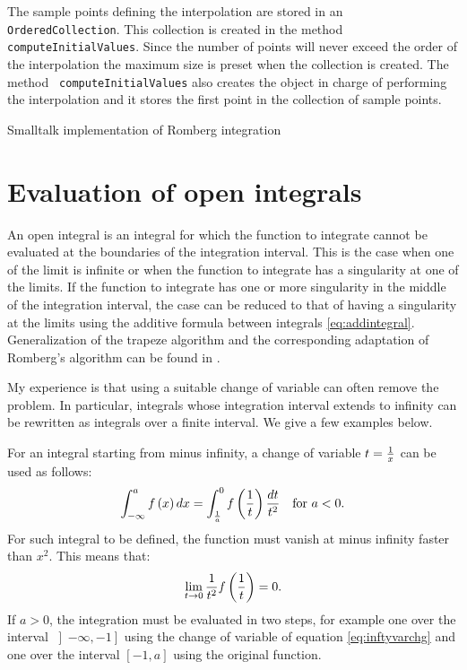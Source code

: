 \documentclass[twoside]{book}
\begin{document}
The sample points defining the interpolation are stored in an {\tt
OrderedCollection}. This collection is created in the method {\tt
computeInitialValues}. Since the number of points will never
exceed the order of the interpolation the maximum size is preset
when the collection is created. The method {\tt
computeInitialValues} also creates the object in charge of
performing the interpolation and it stores the first point in the
collection of sample points.
\begin{listing} Smalltalk implementation of Romberg integration \label{ls:romberg}

\end{listing}

\section{Evaluation of open integrals}
An open integral is an integral for which the function to
integrate cannot be evaluated at the boundaries of the integration
interval. This is the case when one of the limit is infinite or
when the function to integrate has a singularity at one of the
limits. If the function to integrate has one or more singularity
in the middle of the integration interval, the case can be reduced
to that of having a singularity at the limits using the additive
formula between integrals \ref{eq:addintegral}. Generalization of
the trapeze algorithm and the corresponding adaptation of
Romberg's algorithm can be found in \cite{Press}.

 My experience is that using a suitable
change of variable can often remove the problem. In particular,
integrals whose integration interval extends to infinity can be
rewritten as integrals over a finite interval. We give a few
examples below.

For an integral starting from minus infinity, a change of variable
$t={1 \over x}$ can be used as follows:
\begin{equation}
\label{eq:inftyvarchg}
  \int_{-\infty}^a f\left(x\right)dx= \int_{1\over a}^0 f\left({1\over
  t}\right){dt\over t^2}\mbox{\quad for $a<0$.}
\end{equation}
For such integral to be defined, the function must vanish at minus
infinity faster than $x^2$. This means that:
\begin{equation}
  \lim_{t \to 0}{1\over t^2}f\left({1\over
  t}\right)=0.
\end{equation}
If $a>0$, the integration must be evaluated in two steps, for
example one over the interval $\left]-\infty,-1\right]$ using the
change of variable of equation \ref{eq:inftyvarchg} and one over
the interval $\left[-1,a\right]$ using the original function.
\end{document}
